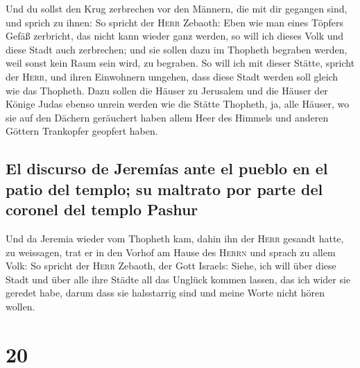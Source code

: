  Und du sollst den Krug zerbrechen vor den Männern, die
mit dir gegangen sind,  und sprich zu ihnen: So spricht
der \textsc{Herr} Zebaoth: Eben wie man eines Töpfers Gefäß zerbricht,
das nicht kann wieder ganz werden, so will ich dieses Volk und diese
Stadt auch zerbrechen; und sie sollen dazu im Thopheth begraben werden,
weil sonst kein Raum sein wird, zu begraben.  So will ich
mit dieser Stätte, spricht der \textsc{Herr}, und ihren Einwohnern
umgehen, dass diese Stadt werden soll gleich wie das Thopheth.
 Dazu sollen die Häuser zu Jerusalem und die Häuser der
Könige Judas ebenso unrein werden wie die Stätte Thopheth, ja, alle
Häuser, wo sie auf den Dächern geräuchert haben allem Heer des Himmels
und anderen Göttern Trankopfer geopfert haben.

\hypertarget{el-discurso-de-jeremuxedas-ante-el-pueblo-en-el-patio-del-templo-su-maltrato-por-parte-del-coronel-del-templo-pashur}{%
\subsection{El discurso de Jeremías ante el pueblo en el patio del
templo; su maltrato por parte del coronel del templo
Pashur}\label{el-discurso-de-jeremuxedas-ante-el-pueblo-en-el-patio-del-templo-su-maltrato-por-parte-del-coronel-del-templo-pashur}}

 Und da Jeremia wieder vom Thopheth kam, dahin ihn der
\textsc{Herr} gesandt hatte, zu weissagen, trat er in den Vorhof am
Hause des \textsc{Herrn} und sprach zu allem Volk:  So
spricht der \textsc{Herr} Zebaoth, der Gott Israels: Siehe, ich will
über diese Stadt und über alle ihre Städte all das Unglück kommen
lassen, das ich wider sie geredet habe, darum dass sie halsstarrig sind
und meine Worte nicht hören wollen.

\hypertarget{section-19}{%
\section{20}\label{section-19}}

